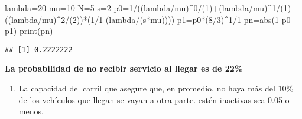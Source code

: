 \documentclass[
]{article}
\newenvironment{Shaded}{\begin{snugshade}}{\end{snugshade}}
\newcommand{\DecValTok}[1]{\textcolor[rgb]{0.00,0.00,0.81}{#1}}
\newcommand{\FunctionTok}[1]{\textcolor[rgb]{0.00,0.00,0.00}{#1}}
\newcommand{\NormalTok}[1]{#1}
\newcommand{\OtherTok}[1]{\textcolor[rgb]{0.56,0.35,0.01}{#1}}
\newcommand{\SpecialCharTok}[1]{\textcolor[rgb]{0.00,0.00,0.00}{#1}}
\providecommand{\tightlist}{%
  \setlength{\itemsep}{0pt}\setlength{\parskip}{0pt}}
\begin{document}
\begin{Shaded}
\begin{Highlighting}[]
\NormalTok{lambda}\OtherTok{=}\DecValTok{20}
\NormalTok{mu}\OtherTok{=}\DecValTok{10}
\NormalTok{N}\OtherTok{=}\DecValTok{5}
\NormalTok{s}\OtherTok{=}\DecValTok{2}
\NormalTok{p0}\OtherTok{=}\DecValTok{1}\SpecialCharTok{/}\NormalTok{((lambda}\SpecialCharTok{/}\NormalTok{mu)}\SpecialCharTok{\^{}}\DecValTok{0}\SpecialCharTok{/}\NormalTok{(}\DecValTok{1}\NormalTok{)}\SpecialCharTok{+}\NormalTok{(lambda}\SpecialCharTok{/}\NormalTok{mu)}\SpecialCharTok{\^{}}\DecValTok{1}\SpecialCharTok{/}\NormalTok{(}\DecValTok{1}\NormalTok{)}\SpecialCharTok{+}\NormalTok{((lambda}\SpecialCharTok{/}\NormalTok{mu)}\SpecialCharTok{\^{}}\DecValTok{2}\SpecialCharTok{/}\NormalTok{(}\DecValTok{2}\NormalTok{))}\SpecialCharTok{*}\NormalTok{(}\DecValTok{1}\SpecialCharTok{/}\DecValTok{1}\SpecialCharTok{{-}}\NormalTok{(lambda}\SpecialCharTok{/}\NormalTok{(s}\SpecialCharTok{*}\NormalTok{mu))))}
\NormalTok{p1}\OtherTok{=}\NormalTok{p0}\SpecialCharTok{*}\NormalTok{(}\DecValTok{8}\SpecialCharTok{/}\DecValTok{3}\NormalTok{)}\SpecialCharTok{\^{}}\DecValTok{1}\SpecialCharTok{/}\DecValTok{1}
\NormalTok{pn}\OtherTok{=}\FunctionTok{abs}\NormalTok{(}\DecValTok{1}\SpecialCharTok{{-}}\NormalTok{p0}\SpecialCharTok{{-}}\NormalTok{p1)}
\FunctionTok{print}\NormalTok{(pn)}
\end{Highlighting}
\end{Shaded}

\begin{verbatim}
## [1] 0.2222222
\end{verbatim}

\textbf{La probabilidad de no recibir servicio al llegar es de 22\%}

\begin{enumerate}
\def\labelenumi{\alph{enumi})}
\setcounter{enumi}{4}
\tightlist
\item
  La capacidad del carril que asegure que, en promedio, no haya más del
  10\% de los vehículos que llegan se vayan a otra parte. estén
  inactivas sea 0.05 o menos.
\end{enumerate}
\end{document}
